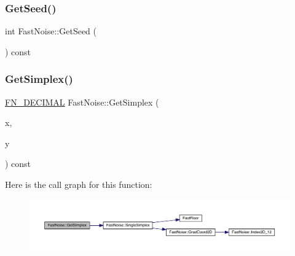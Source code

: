\subsubsection{\texorpdfstring{Get\+Seed()}{GetSeed()}}
{\footnotesize\ttfamily int Fast\+Noise\+::\+Get\+Seed (\begin{DoxyParamCaption}{ }\end{DoxyParamCaption}) const\hspace{0.3cm}{\ttfamily [inline]}}

\mbox{\label{class_fast_noise_a465c9c71c7a2b9f1e8093d85a6c0de4a}} 
\subsubsection{\texorpdfstring{Get\+Simplex()}{GetSimplex()}\hspace{0.1cm}{\footnotesize\ttfamily [1/3]}}
{\footnotesize\ttfamily \mbox{\hyperlink{_fast_noise_8h_a75a9ef6d2541c4921815b885bfd449c3}{F\+N\+\_\+\+D\+E\+C\+I\+M\+AL}} Fast\+Noise\+::\+Get\+Simplex (\begin{DoxyParamCaption}\item[{\mbox{\hyperlink{_fast_noise_8h_a75a9ef6d2541c4921815b885bfd449c3}{F\+N\+\_\+\+D\+E\+C\+I\+M\+AL}}}]{x,  }\item[{\mbox{\hyperlink{_fast_noise_8h_a75a9ef6d2541c4921815b885bfd449c3}{F\+N\+\_\+\+D\+E\+C\+I\+M\+AL}}}]{y }\end{DoxyParamCaption}) const}

Here is the call graph for this function\+:
\nopagebreak
\begin{figure}[H]
\begin{center}
\leavevmode
\includegraphics[width=350pt]{d1/dd8/class_fast_noise_a465c9c71c7a2b9f1e8093d85a6c0de4a_cgraph}
\end{center}
\end{figure}
\mbox{\label{class_fast_noise_a4ab5e306f72c428fef0e69be3166c07d}} 
